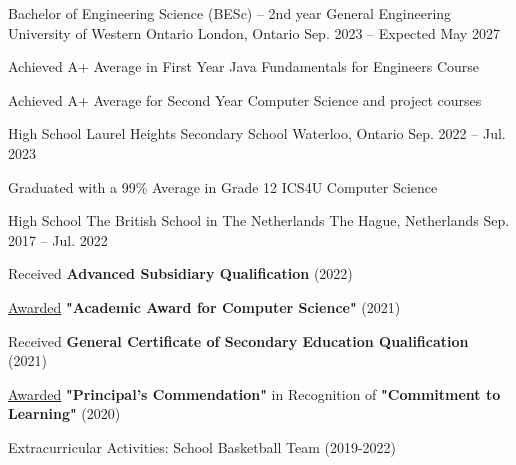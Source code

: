 


\begin{cventries}

  \cventry
    {Bachelor of Engineering Science (BESc) – 2nd year General Engineering} %
    {University of Western Ontario} %
    {London, Ontario} %
    {Sep. 2023 -- Expected May 2027} %
    {
      \begin{cvitems}
      \item{Achieved A+ Average in First Year Java Fundamentals for Engineers Course}
      \item{Achieved A+ Average for Second Year Computer Science and project courses}
      \end{cvitems}
    }


  \cventry
    {High School} %
    {Laurel Heights Secondary School} %
    {Waterloo, Ontario} %
    {Sep. 2022 -- Jul. 2023} %
    {
      \begin{cvitems}
      \item{Graduated with a 99\% Average in Grade 12 ICS4U Computer Science}
      \end{cvitems}
    }
  \cventry
    {High School} %
    {The British School in The Netherlands} %
    {The Hague, Netherlands} %
    {Sep. 2017 -- Jul. 2022} %
    {
      \begin{cvitems}
      \item {Received \textbf{Advanced Subsidiary Qualification} (2022)}
      \item {\underline{Awarded} \textbf{"Academic Award for Computer Science"} (2021)}
      \item {Received \textbf{General Certificate of Secondary Education Qualification} (2021)}
      \item {\underline{Awarded} \textbf{"Principal's Commendation"} in Recognition of \textbf{"Commitment to Learning"} (2020)}
      \item{Extracurricular Activities: School Basketball Team (2019-2022)}
      \end{cvitems}
    }


\end{cventries}


